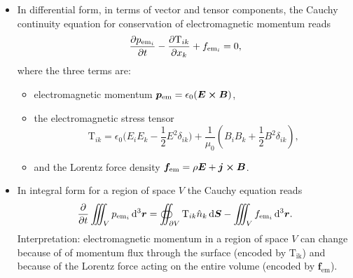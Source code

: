 \documentclass[11pt, a4paper]{article}
\newcommand{\diff}{\mathop{}\!\mathrm{d}} %
\newcommand{\dr}{\diff^{3} \r}  %
\renewcommand{\vec}[1]{\bm{#1}} %
\renewcommand{\r}{\vec{r}}
\newcommand{\E}{\vec{E}} %
\newcommand{\B}{\vec{B}} %
\newcommand{\TT}{\mathrm{T}}  %
\newcommand{\ee}{\epsilon_{0}}  %
\newcommand{\mm}{\mu_{0}}  %
\renewcommand{\j}{\vec{j}}  %
\begin{document}
\begin{itemize}
    \item In differential form, in terms of vector and tensor components, the Cauchy continuity equation for conservation of electromagnetic momentum reads
    \begin{equation*}
        \pdv{p_{\text{em}_{i}}}{t} - \pdv{\TT_{ik}}{x_{k}} + f_{\text{em}_{i}} = 0,
    \end{equation*}
    where the three terms are:
    \begin{itemize}
        \item electromagnetic momentum $ \vec{p}_{\text{em}} = \ee (\E \cross \B) $,

        \item the electromagnetic stress tensor 
        \begin{equation*}
            \TT_{ik} = \ee \big(E_{i}E_{k} - \frac{1}{2}E^{2}\delta_{ik}\big) + \frac{1}{\mm}\left(B_{i}B_{k} + \frac{1}{2}B^{2}\delta_{ik}\right),
        \end{equation*}
        
        \item and the Lorentz force density $ \vec{f}_{\text{em}} = \rho \E + \j \cross \B $.
    \end{itemize}
    
    \item In integral form for a region of space $ V $ the Cauchy equation reads
    \begin{equation*}
        \pdv{t} \iiint_{V} p_{\text{em}_{i}} \dr = \oiint_{\partial V} \TT_{ik}\hat{n}_{k}\diff \vec{S} - \iiint_{V}f_{\text{em}_{i}}\dr.
    \end{equation*}
	Interpretation: electromagnetic momentum in a region of space $ V $ can change because of of momentum flux through the surface (encoded by $ \TT_{\text{ik}} $) and because of the Lorentz force acting on the entire volume (encoded by $ \vec{f}_{\text{em}} $). 
    
    
    
\end{itemize}
\end{document}
